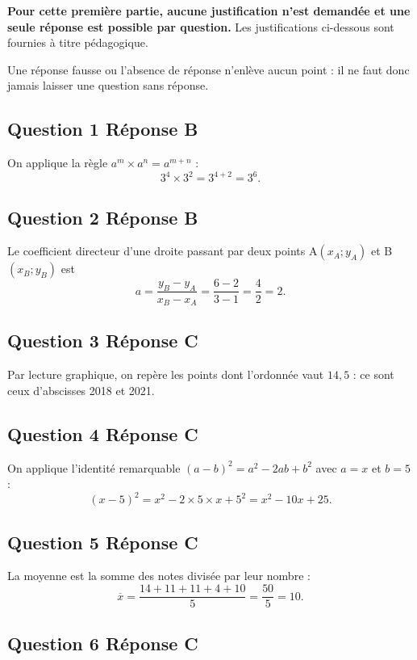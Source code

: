 \textbf{Pour cette première partie, aucune justification n'est demandée et une seule réponse est possible par question.} Les justifications ci-dessous sont fournies à titre pédagogique.

Une réponse fausse ou l'absence de réponse n'enlève aucun point : il ne faut donc jamais laisser une question sans réponse.

\subsection*{Question 1 \quad Réponse B}

On applique la règle $a^m \times a^n = a^{m+n}$ :
\[3^4 \times 3^2 = 3^{4+2} = 3^6.\]

\subsection*{Question 2 \quad Réponse B}

Le coefficient directeur d'une droite passant par deux points A$(x_A ; y_A)$ et
B$(x_B ; y_B)$ est
\[a = \dfrac{y_B - y_A}{x_B - x_A} = \dfrac{6-2}{3-1} = \dfrac{4}{2} = 2.\]

\subsection*{Question 3 \quad Réponse C}

Par lecture graphique, on repère les points dont l'ordonnée vaut $14,5$ : ce sont ceux
d'abscisses 2018 et 2021.

\subsection*{Question 4 \quad Réponse C}

On applique l'identité remarquable $(a-b)^2 = a^2 - 2ab + b^2$ avec $a = x$ et $b = 5$ :
\[(x-5)^2 = x^2 - 2\times 5 \times x + 5^2 = x^2 - 10x + 25.\]

\subsection*{Question 5 \quad Réponse C}

La moyenne est la somme des notes divisée par leur nombre :
\[\overline{x} = \dfrac{14+11+11+4+10}{5} = \dfrac{50}{5} = 10.\]

\subsection*{Question 6 \quad Réponse C}

